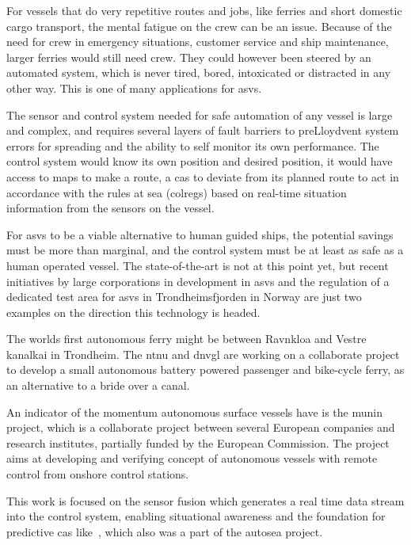 For vessels that do very repetitive routes and jobs, like ferries and short domestic cargo transport, the mental fatigue on the crew can be an issue. Because of the need for crew in emergency situations, customer service and ship maintenance, larger ferries would still need crew. They could however been steered by an automated system, which is never tired, bored, intoxicated or distracted in any other way. This is one of many applications for \glspl{asv}.

The sensor and control system needed for safe automation of any vessel is large and complex, and requires several layers of fault barriers to preLloydvent system errors for spreading and the ability to self monitor its own performance. The control system would know its own position and desired position, it would have access to maps to make a route, a \gls{cas} to deviate from its planned route to act in accordance with the rules at sea (\gls{colregs}) based on real-time situation information from the sensors on the vessel.

For \glspl{asv} to be a viable alternative to human guided ships, the potential savings must be more than marginal, and the control system must be at least as safe as a human operated vessel. The state-of-the-art is not at this point yet, but recent initiatives by large corporations in development in \glspl{asv} and the regulation of a dedicated test area for \glspl{asv} in Trondheimsfjorden in Norway are just two examples on the direction this technology is headed.

The worlds first autonomous ferry might be between Ravnkloa and Vestre kanalkai in Trondheim. The \gls{ntnu} and \gls{dnvgl} are working on a collaborate project to develop a small autonomous battery powered passenger and bike-cycle ferry, as an alternative to a bride over a canal. 

An indicator of the momentum autonomous surface vessels have is the \gls{munin} project, which is a collaborate project between several European companies and research institutes, partially funded by the European Commission. The project aims at developing and verifying concept of autonomous vessels with remote control from onshore control stations.

This work is focused on the sensor fusion which generates a real time data stream into the control system, enabling situational awareness and the foundation for predictive \gls{cas} like~\cite{Hagen2017}, which also was a part of the \gls{autosea} project.

